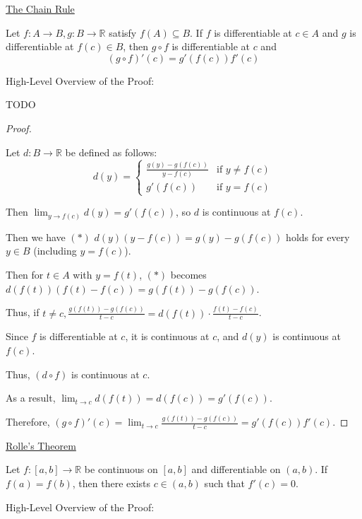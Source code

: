 \documentclass[12pt]{article}
\newcommand{\RR}{\mathbb{R}} %
\begin{document}
\pagebreak

\underline{The Chain Rule}

Let $f : A \rightarrow B, g : B \rightarrow \RR$ satisfy $f(A) \subseteq B$. If $f$ is differentiable at $c \in A$ and $g$ is differentiable at $f(c) \in B$, then $g \circ f$ is differentiable at $c$ and
\[
(g \circ f)'(c) = g'(f(c)) f'(c)
\]

\dotfill

High-Level Overview of the Proof:

TODO

\dotfill

\begin{proof}
$ $

Let $d : B \rightarrow \RR$ be defined as follows:
\[
d(y) =
\begin{cases}
	\frac{g(y) - g(f(c))}{y - f(c)} & \text{if }y \ne f(c) \\
	g'(f(c)) & \text{if }y = f(c)
\end{cases}
\]

Then $\lim_{y \rightarrow f(c)} d(y) = g'(f(c))$, so $d$ is continuous at $f(c)$.

Then we have $(\ast)$ $d(y) (y - f(c)) = g(y) - g(f(c))$ holds for every $y \in B$ (including $y = f(c)$).

Then for $t \in A$ with $y = f(t)$, $(\ast)$ becomes
\\
$d(f(t)) (f(t) - f(c)) = g(f(t)) - g(f(c))$.

Thus, if $t \ne c, \frac{g(f(t)) - g(f(c))}{t - c} = d(f(t)) \cdot \frac{f(t) - f(c)}{t - c}$.

Since $f$ is differentiable at $c$, it is continuous at $c$, and $d(y)$ is continuous at $f(c)$.

Thus, $(d \circ f)$ is continuous at $c$.

As a result, $\lim_{t \rightarrow c} d(f(t)) = d(f(c)) = g'(f(c))$.

Therefore, $(g \circ f)'(c) = \lim_{t \rightarrow c} \frac{g(f(t)) - g(f(c))}{t - c} = g'(f(c)) f'(c)$.
\end{proof}

\pagebreak

\underline{Rolle's Theorem}

Let $f : [a, b] \rightarrow \RR$ be continuous on $[a, b]$ and differentiable on $(a, b)$. If $f(a) = f(b)$, then there exists $c \in (a, b)$ such that $f'(c) = 0$.

\dotfill

High-Level Overview of the Proof:
\end{document}
